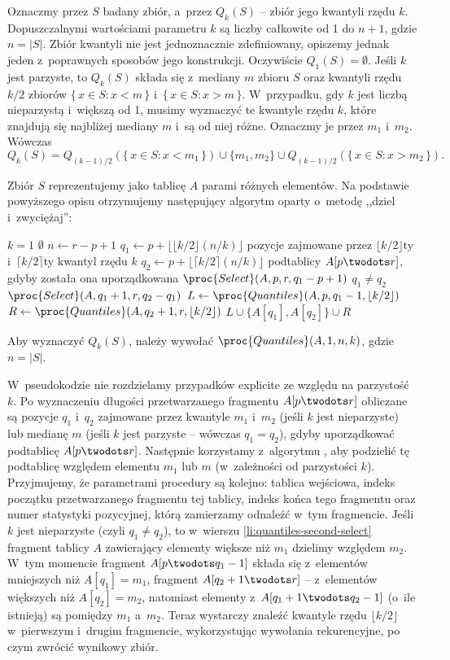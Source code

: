 \exercise %
Oznaczmy przez $S$ badany zbiór, a~przez $Q_k(S)$ -- zbiór jego kwantyli rzędu $k$.
Dopuszczalnymi wartościami parametru $k$ są liczby całkowite od 1 do $n+1$, gdzie $n=|S|$.
Zbiór kwantyli nie jest jednoznacznie zdefiniowany, opiszemy jednak jeden z~poprawnych sposobów jego konstrukcji.
Oczywiście $Q_1(S)=\emptyset$.
Jeśli $k$ jest parzyste, to $Q_k(S)$ składa się z~mediany $m$ zbioru $S$ oraz kwantyli rzędu $k/2$ zbiorów $\{\,x\in S:x<m\,\}$ i~$\{\,x\in S:x>m\,\}$.
W~przypadku, gdy $k$ jest liczbą nieparzystą i~większą od 1, musimy wyznaczyć te kwantyle rzędu $k$, które znajdują się najbliżej mediany $m$ i~są od niej różne.
Oznaczmy je przez $m_1$ i~$m_2$.
Wówczas
\[
	Q_k(S) = Q_{(k-1)/2}(\{\,x\in S:x<m_1\,\})\cup\{m_1,m_2\}\cup Q_{(k-1)/2}(\{\,x\in S:x>m_2\,\}).
\]

Zbiór $S$ reprezentujemy jako tablicę $A$ parami różnych elementów.
Na podstawie powyższego opisu otrzymujemy następujący algorytm oparty o~metodę ,,dziel i~zwyciężaj'':
\begin{codebox}
\li	\If $k=1$
\li		\Then \Return $\emptyset$
		\End
\li	$n\gets r-p+1$
\li	$q_1\gets p+\lfloor\lfloor k/2\rfloor(n/k)\rfloor$ \>\>\>\>\>\>\Comment pozycje zajmowane przez $\lfloor k/2\rfloor$\nbhyphen ty i~$\lceil k/2\rceil$\nbhyphen ty kwantyl rzędu $k$
\li	$q_2\gets p+\lfloor\lceil k/2\rceil(n/k)\rfloor$ \>\>\>\>\>\>\>podtablicy $A[p\twodots r]$, gdyby została ona uporządkowana
\li	$\proc{Select}(A,p,r,q_1-p+1)$
\li	\If $q_1\ne q_2$
\li		\Then $\proc{Select}(A,q_1+1,r,q_2-q_1)$ \label{li:quantiles-second-select}
		\End
\li	$L\gets\proc{Quantiles}(A,p,q_1-1,\lfloor k/2\rfloor)$
\li	$R\gets\proc{Quantiles}(A,q_2+1,r,\lfloor k/2\rfloor)$
\li	\Return $L\cup\{A[q_1],A[q_2]\}\cup R$
\end{codebox}
Aby wyznaczyć $Q_k(S)$, należy wywołać $\proc{Quantiles}(A,1,n,k)$, gdzie $n=|S|$.

W~pseudokodzie nie rozdzielamy przypadków explicite ze względu na parzystość $k$.
Po wyznaczeniu długości przetwarzanego fragmentu $A[p\twodots r]$ obliczane są pozycje $q_1$ i~$q_2$ zajmowane przez kwantyle $m_1$ i~$m_2$ (jeśli $k$ jest nieparzyste) lub medianę $m$ (jeśli $k$ jest parzyste -- wówczas $q_1=q_2$), gdyby uporządkować podtablicę $A[p\twodots r]$.
Następnie korzystamy z~algorytmu , aby podzielić tę podtablicę względem elementu $m_1$ lub $m$ (w~zależności od parzystości $k$).
Przyjmujemy, że parametrami procedury  są kolejno: tablica wejściowa, indeks początku przetwarzanego fragmentu tej tablicy, indeks końca tego fragmentu oraz numer statystyki pozycyjnej, którą zamierzamy odnaleźć w~tym fragmencie.
Jeśli $k$ jest nieparzyste (czyli $q_1\ne q_2$), to w~wierszu \ref{li:quantiles-second-select} fragment tablicy $A$ zawierający elementy większe niż $m_1$ dzielimy względem $m_2$.
W~tym momencie fragment $A[p\twodots q_1-1]$ składa się z~elementów mniejszych niż $A[q_1]=m_1$, fragment $A[q_2+1\twodots r]$ -- z~elementów większych niż $A[q_2]=m_2$, natomiast elementy z~$A[q_1+1\twodots q_2-1]$ (o~ile istnieją) są pomiędzy $m_1$ a~$m_2$.
Teraz wystarczy znaleźć kwantyle rzędu $\lfloor k/2\rfloor$ w~pierwszym i~drugim fragmencie, wykorzystując wywołania rekurencyjne, po czym zwrócić wynikowy zbiór.

